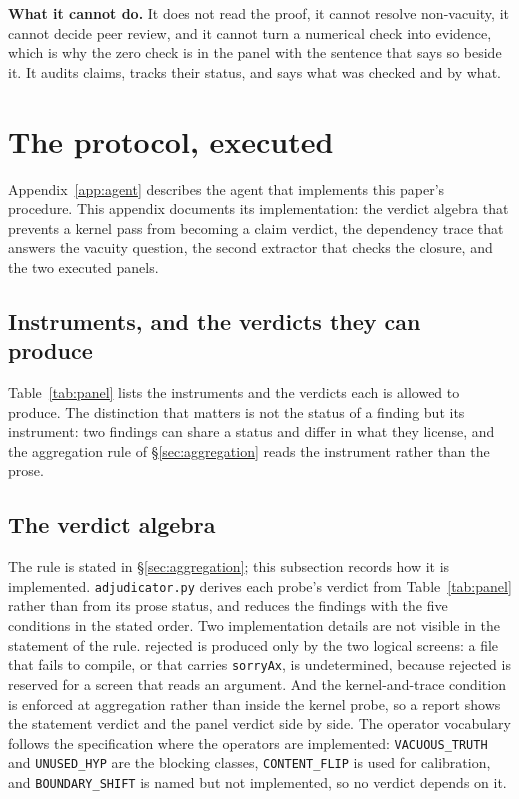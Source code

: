 \documentclass[11pt,a4paper]{article}
\newcommand{\verdict}[1]{\textsf{#1}}
\begin{document}
\textbf{What it cannot do.} It does not read the proof, it cannot resolve non-vacuity, it
cannot decide peer review, and it cannot turn a numerical check into evidence, which is why the
zero check is in the panel with the sentence that says so beside it. It audits claims, tracks
their status, and says what was checked and by what.

\section{The protocol, executed}
\label{app:executed}

Appendix~\ref{app:agent} describes the agent that implements this paper's procedure. This appendix
documents its implementation: the verdict algebra that prevents a kernel pass from becoming a
claim verdict, the dependency trace that answers the vacuity question, the second extractor that
checks the closure, and the two executed panels.

\subsection{Instruments, and the verdicts they can produce}

Table~\ref{tab:panel} lists the instruments and the verdicts each is allowed to produce. The
distinction that matters is not the status of a finding but its instrument: two findings can
share a status and differ in what they license, and the aggregation rule of \S\ref{sec:aggregation}
reads the instrument rather than the prose.


\subsection{The verdict algebra}
\label{sec:algebra}

The rule is stated in \S\ref{sec:aggregation}; this subsection records how it is implemented.
\texttt{adjudicator.py} derives each probe's verdict from Table~\ref{tab:panel} rather than from its
prose status, and reduces the findings with the five conditions in the stated order. Two
implementation details are not visible in the statement of the rule. \verdict{rejected} is produced
only by the two logical screens: a file that fails to compile, or that carries \texttt{sorryAx}, is
\verdict{undetermined}, because \verdict{rejected} is reserved for a screen that reads an argument.
And the kernel-and-trace condition is enforced at aggregation rather than inside the kernel probe,
so a report shows the statement verdict and the panel verdict side by side. The operator vocabulary
follows the specification where the operators are implemented: \texttt{VACUOUS\_TRUTH} and
\texttt{UNUSED\_HYP} are the blocking classes, \texttt{CONTENT\_FLIP} is used for calibration, and
\texttt{BOUNDARY\_SHIFT} is named but not implemented, so no verdict depends on it.
\end{document}

